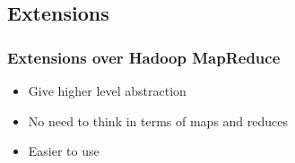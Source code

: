 \subsection{Extensions}
\begin{frame}
 \frametitle{Extensions over Hadoop MapReduce}
 \begin{itemize}
  \item Give higher level abstraction
  \item No need to think in terms of maps and reduces
  \item Easier to use
 \end{itemize}
\end{frame}

